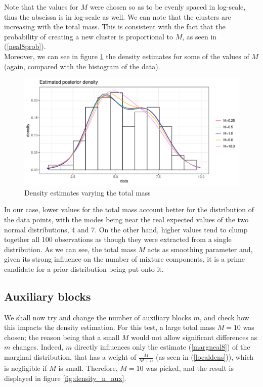Note that the values for $M$ were chosen so as to be evenly spaced in log-scale, thus the abscissa is in log-scale as well.
We can note that the clusters are increasing with the total mass.
This is consistent with the fact that the probability of creating a new cluster is proportional to $M$, as seen in (\ref{neal8prob}). \\
Moreover, we can see in figure \ref{fig:density_total_mass} the density estimates for some of the values of $M$ (again, compared with the histogram of the data).

\clearpage

\begin{figure}[h]
	\centering
	\includegraphics[scale=0.55]{etc/dens_withMm3.pdf}
	\caption{Density estimates varying the total mass}

	\label{fig:density_total_mass}
\end{figure}


In our case, lower values for the total mass account better for the distribution of the data points, with the modes being near the real expected values of the two normal distributions, 4 and 7.
On the other hand, higher values tend to clump together all 100 observations as though they were extracted from a single distribution.
As we can see, the total mass $M$ acts as smoothing parameter and, given its strong influence on the number of mixture components, it is a prime candidate for a prior distribution being put onto it.



\subsection{Auxiliary blocks}
We shall now try and change the number of auxiliary blocks $m$, and check how this impacts the density estimation.
For this test, a large total mass $M=10$ was chosen; the reason being that a small $M$ would not allow significant differences as $m$ changes.
Indeed, $m$ directly influences only the estimate (\ref{margneal8}) of the marginal distribution, that has a weight of $\frac{M}{M+n}$ (as seen in (\ref{localdens})), which is negligible if $M$ is small.
Therefore, $M=10$ was picked, and the result is displayed in figure \ref{fig:density_n_aux}.


